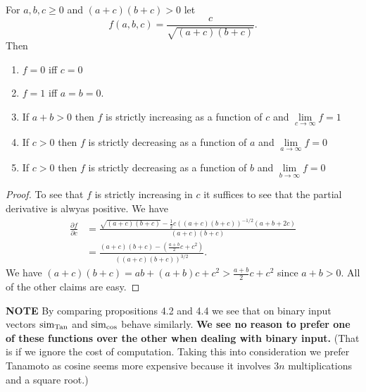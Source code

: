 \documentclass{article}
\begin{document}
\begin{proposition}
For $a,b,c\geq 0$ and $(a+c)(b+c)>0$ let 
\begin{equation}
f(a,b,c)=\frac{c}{\sqrt{(a+c)(b+c)}}.
\end{equation}
Then
\begin{enumerate}
  \item $f=0$ iff $c=0$
  \item $f=1$ iff $a=b=0$.
  \item If $a+b>0$ then $f$ is strictly increasing as a function of $c$ and
  $\lim\limits_{c\to\infty}f=1$
  \item If $c>0$ then $f$ is strictly decreasing as a function of $a$ and
  $\lim\limits_{a\to\infty}f=0$
  \item If $c>0$ then $f$ is strictly decreasing as a function of $b$ and
  $\lim\limits_{b\to\infty}f=0$
\end{enumerate}
\end{proposition}
\begin{proof}
To see that $f$ is strictly increasing in $c$ it suffices to see that the
partial derivative is alwyas positive. We have
\begin{equation}
\begin{split}
\frac{\partial f}{\partial c} &= 
\frac{\sqrt{(a+c)(b+c)}-\frac{1}{2}c\left((a+c)(b+c)\right)^{-1/2}(a+b+2c)}{(a+c)(b+c)}\\ 
&= \frac{(a+c)(b+c)-(\frac{a+b}{2}c+c^2)}{\left((a+c)(b+c)\right)^{3/2}}.
\end{split}
\end{equation}
We have $(a+c)(b+c)=ab+(a+b)c+c^2>\frac{a+b}{2}c+c^2$ since $a+b>0$. All of the
other claims are easy.
\end{proof}

\textbf{NOTE}
By comparing propositions 4.2 and 4.4 we see that on binary input vectors $\operatorname{sim_{Tan}}$
and $\operatorname{sim_{cos}}$ behave similarly.
\textbf{We see no reason to prefer one of these functions over the other
when dealing with binary input.} (That is if we ignore the cost of computation.
Taking this into consideration we prefer Tanamoto as cosine seems more expensive
because it involves $3n$ multiplications and a square root.)
\end{document}
